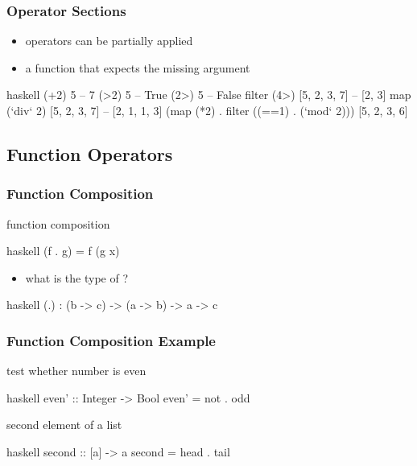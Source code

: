\documentclass[dvipsnames]{beamer}
\theoremstyle{plain}
\begin{document}
\begin{frame}[fragile]
  \frametitle{Operator Sections}

  \begin{itemize}
    \item operators can be partially applied
    \item a function that expects the missing argument
  \end{itemize}

  \begin{exampleblock}{}
    \begin{pygments}{haskell}
(+2) 5                      -- 7
(>2) 5                      -- True
(2>) 5                      -- False
filter (4>) [5, 2, 3, 7]    -- [2, 3]
map (`div` 2) [5, 2, 3, 7]  -- [2, 1, 1, 3]
(map (*2) . filter ((==1) . (`mod` 2))) [5, 2, 3, 6]
    \end{pygments}
  \end{exampleblock}
\end{frame}

\subsection{Function Operators}

\begin{frame}[fragile]
  \frametitle{Function Composition}

  \begin{block}{function composition}
    \begin{pygments}{haskell}
(f . g) = f (g x)
    \end{pygments}
  \end{block}

  \pause
  \begin{itemize}
    \item what is the type of ?
  \end{itemize}

  \begin{exampleblock}{}
    \begin{pygments}{haskell}
(.) : (b -> c) -> (a -> b) -> a -> c
    \end{pygments}
  \end{exampleblock}
\end{frame}

\begin{frame}[fragile]
  \frametitle{Function Composition Example}

  \begin{exampleblock}{test whether number is even}
    \begin{pygments}{haskell}
even' :: Integer -> Bool
even' = not . odd
    \end{pygments}
  \end{exampleblock}

  \pause
  \begin{exampleblock}{second element of a list}
    \begin{pygments}{haskell}
second :: [a] -> a
second = head . tail
    \end{pygments}
  \end{exampleblock}
\end{frame}
\end{document}
